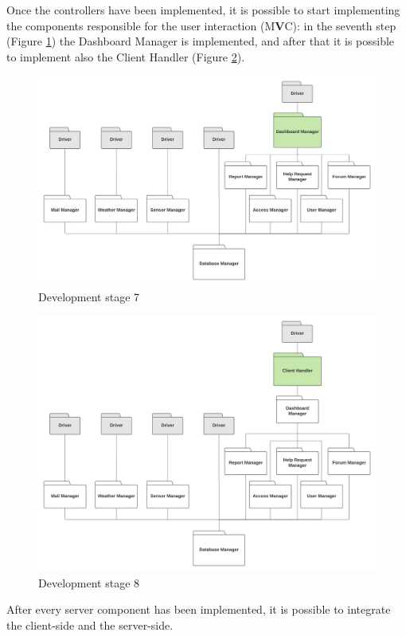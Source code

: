 \documentclass[10pt]{article} %
\begin{document}
Once the controllers have been implemented, it is possible to start implementing the components responsible for the user interaction (M\textbf{V}C): 
in the seventh step (Figure \ref{fig:impl7}) the Dashboard Manager is implemented, and after that it is possible to implement also the Client Handler (Figure \ref{fig:impl8}).
\begin{figure}[h!]
    \centering
    \centerline{\includegraphics[scale=0.4]{images/impl/step7.png}}
    \caption{Development stage 7}
    \label{fig:impl7}
\end{figure}
\begin{figure}[h!]
    \centering
    \centerline{\includegraphics[scale=0.4]{images/impl/step8.png}}
    \caption{Development stage 8}
    \label{fig:impl8}
\end{figure}

After every server component has been implemented, it is possible to integrate the client-side and the server-side.
\end{document}
